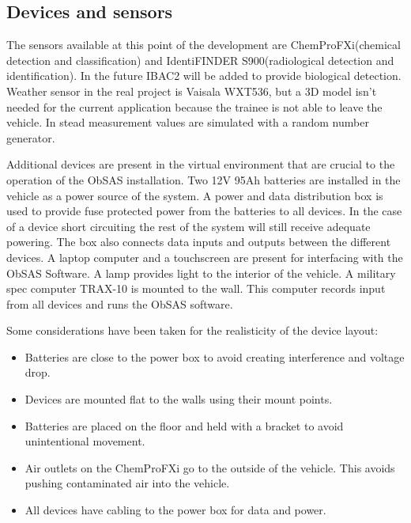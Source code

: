 \documentclass[12pt, a4paper,oneside, nocenter]{thesis}
\begin{document}
\subsection{Devices and sensors}
The sensors available at this point of the development are ChemProFXi(chemical detection and classification) and IdentiFINDER S900(radiological detection and identification). In the future IBAC2 will be added to provide biological detection. Weather sensor in the real project is Vaisala WXT536, but a 3D model isn't needed for the current application because the trainee is not able to leave the vehicle. In stead measurement values are simulated with a random number generator.
\par
Additional devices are present in the virtual environment that are crucial to the operation of the ObSAS installation. Two 12V 95Ah batteries are installed in the vehicle as a power source of the system. A power and data distribution box is used to provide fuse protected power from the batteries to all devices. In the case of a device short circuiting the rest of the system will still receive adequate powering. The box also connects data inputs and outputs between the different devices. A laptop computer and a touchscreen are present for interfacing with the ObSAS Software. A lamp provides light to the interior of the vehicle. A military spec computer TRAX-10 is mounted to the wall. This computer records input from all devices and runs the ObSAS software.
\par
Some considerations have been taken for the realisticity of the device layout:
\begin{itemize}
  \item Batteries are close to the power box to avoid creating interference and voltage drop.
  \item Devices are mounted flat to the walls using their mount points.
  \item Batteries are placed on the floor and held with a bracket to avoid unintentional movement.
  \item Air outlets on the ChemProFXi go to the outside of the vehicle. This avoids pushing contaminated air into the vehicle.
  \item All devices have cabling to the power box for data and power.
\end{itemize}
\end{document}

